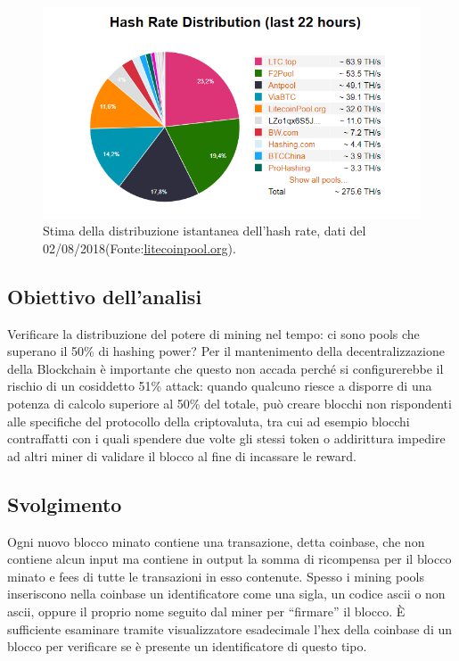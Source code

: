 \begin{figure}[h!]
	\centering
	\includegraphics[width=1.0\linewidth]{images/HashingPower020818}
	\caption{Stima della distribuzione istantanea dell'hash rate, dati del 02/08/2018(Fonte:\url{litecoinpool.org}).}
	\label{fig:hashingpower020818}
\end{figure}


\subsection{Obiettivo dell’analisi}
Verificare la distribuzione del potere di mining nel tempo: ci sono pools che superano il 50\% di hashing power? Per il mantenimento della decentralizzazione della Blockchain è importante che questo non accada perché si configurerebbe il rischio di un cosiddetto 51\% attack: quando qualcuno riesce a disporre di una potenza di calcolo superiore al 50\% del totale, può creare blocchi non rispondenti alle specifiche del protocollo della criptovaluta, tra cui ad esempio blocchi contraffatti con i quali spendere due volte gli stessi token o addirittura impedire ad altri miner di validare il blocco al fine di incassare le reward.


\subsection{Svolgimento}
Ogni nuovo blocco minato contiene una transazione, detta coinbase, che non contiene alcun input ma contiene in output la somma di ricompensa per il blocco minato e fees di tutte le transazioni in esso contenute.
Spesso i mining pools inseriscono nella coinbase un identificatore come una sigla, un codice ascii o non ascii, oppure il proprio nome seguito dal miner per “firmare” il blocco. È sufficiente esaminare tramite visualizzatore esadecimale l’hex della coinbase di un blocco per verificare se è presente un identificatore di questo tipo.

